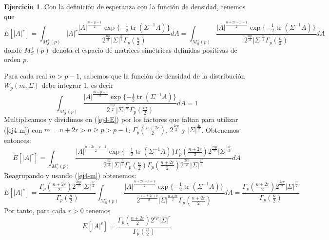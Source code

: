 \documentclass[12pt,spanish]{article}
\theoremstyle{definition}
\newtheorem{exercise}{Ejercicio}
\begin{document}
\begin{exercise} %
  Con la definición de esperanza con la función de densidad, tenemos que
  \begin{equation}\label{ej4-E}
    E[|A|^r]=\int_{M_S^+(p)}|A|^r\frac{|A|^\frac{n-p-1}{2}\exp\{-\frac{1}{2}\operatorname{tr}(\Sigma^{-1}A)\}}{2^\frac{np}{2}|\Sigma|^\frac{n}{2}\Gamma_p(\frac{n}{2})}dA=\int_{M_S^+(p)}\frac{|A|^\frac{n+2r-p-1}{2}\exp\{-\frac{1}{2}\operatorname{tr}(\Sigma^{-1}A)\}}{2^\frac{np}{2}|\Sigma|^\frac{n}{2}\Gamma_p(\frac{n}{2})}dA\end{equation}
  donde $M_S^+(p)$ denota el espacio de matrices simétricas definidas positivas de orden $p$.

  Para cada real $m>p-1$, sabemos que la función de densidad de la distribución $W_p(m,\Sigma)$ debe integrar 1, es decir
  \begin{equation}\label{ej4-m}\int_{M_S^+(p)}\frac{|A|^\frac{m-p-1}{2}\exp\{-\frac{1}{2}\operatorname{tr}(\Sigma^{-1}A)\}}{2^\frac{mp}{2}|\Sigma|^\frac{m}{2}\Gamma_p(\frac{m}{2})}dA=1\end{equation}
  Multiplicamos y dividimos en (\ref{ej4-E}) por los factores que
  faltan para utilizar (\ref{ej4-m}) con $m=n+2r>n\geq p>p-1$:
  $\Gamma_p(\frac{n+2r}{2})$, $2^\frac{2rp}{2}$ y $|\Sigma|^\frac{2r}{2}$. Obtenemos entonces:
  \[E[|A|^r]=\int_{M_S^+(p)}\frac{|A|^\frac{n+2r-p-1}{2}\exp\{-\frac{1}{2}\operatorname{tr}(\Sigma^{-1}A)\}\Gamma_p(\frac{n+2r}{2})2^\frac{2rp}{2}|\Sigma|^\frac{2r}{2}}{2^\frac{np}{2}|\Sigma|^\frac{n}{2}\Gamma_p(\frac{n}{2})\Gamma_p(\frac{n+2r}{2})2^\frac{2rp}{2}|\Sigma|^\frac{2r}{2}}dA\]
  Reagrupando y usando (\ref{ej4-m}) obtenemos:
  \[E[|A|^r]=\frac{\Gamma_p(\frac{n+2r}{2})2^\frac{2rp}{2}|\Sigma|^\frac{2r}{2}}{\Gamma_p(\frac{n}{2})}\int_{M_S^+(p)}\frac{|A|^\frac{n+2r-p-1}{2}\exp\{-\frac{1}{2}\operatorname{tr}(\Sigma^{-1}A)\}}{2^\frac{(n+2r)p}{2}|\Sigma|^\frac{n+2r}{2}\Gamma_p(\frac{n+2r}{2})}dA=\frac{\Gamma_p(\frac{n+2r}{2})2^\frac{2rp}{2}|\Sigma|^\frac{2r}{2}}{\Gamma_p(\frac{n}{2})}\]
  Por tanto, para cada $r>0$ tenemos
  \[E[|A|^r]=\frac{\Gamma_p(\frac{n+2r}{2})2^{rp}|\Sigma|^r}{\Gamma_p(\frac{n}{2})}\]
\end{exercise}

\pagebreak
\end{document}
